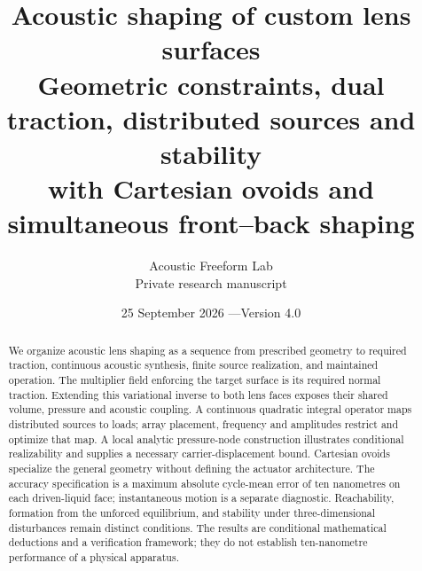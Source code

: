 \documentclass[11pt,a4paper]{article}
\title{Acoustic shaping of custom lens surfaces\\[0.5em]
\large Geometric constraints, dual traction, distributed sources and stability\\
with Cartesian ovoids and simultaneous front--back shaping}
\author{Acoustic Freeform Lab\\\small Private research manuscript}
\date{25 September 2026 \quad---\quad Version 4.0}
\numberwithin{equation}{section}
\begin{document}
\maketitle
\begin{abstract}
We organize acoustic lens shaping as a sequence from prescribed geometry to
required traction, continuous acoustic synthesis, finite source realization,
and maintained operation. The multiplier field enforcing the target surface is
its required normal traction. Extending this variational inverse to both lens
faces exposes their shared volume, pressure and acoustic coupling. A continuous
quadratic integral operator maps distributed sources to loads; array placement,
frequency and amplitudes restrict and optimize that map. A local analytic
pressure-node construction illustrates conditional realizability and supplies
a necessary carrier-displacement bound. Cartesian ovoids specialize the general
geometry without defining the actuator architecture. The accuracy specification
is a maximum absolute cycle-mean error of ten nanometres on each driven-liquid
face; instantaneous motion is a separate diagnostic. Reachability, formation from the
unforced equilibrium, and stability under three-dimensional disturbances remain
distinct conditions. The results are conditional mathematical deductions and a
verification framework; they do not establish ten-nanometre performance of a
physical apparatus.
\end{abstract}
\clearpage
{\small\tableofcontents}
\clearpage





















\appendix


\clearpage
\printbibliography[heading=bibintoc,title={References}]
\end{document}
